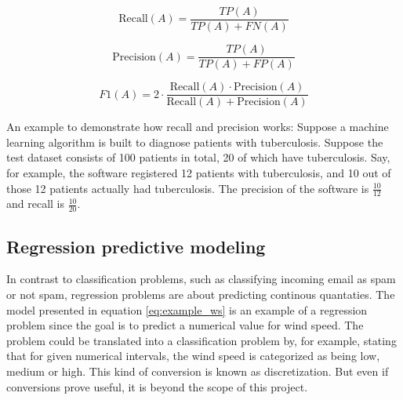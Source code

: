 \begin{equation} \label{eq:recall}
	\mbox{Recall}(A) = \frac{TP(A)}{TP(A) + FN(A)}
\end{equation}

\begin{equation} \label{eq:precision}
	\mbox{Precision}(A) = \frac{TP(A)}{TP(A) + FP(A)}
\end{equation}

\begin{equation} \label{eq:f1}
	F1(A) = 2 \cdot \frac{\mbox{Recall}(A) \cdot \mbox{Precision}(A)}{\mbox{Recall}(A) + \mbox{Precision}(A)}
\end{equation}

	An example to demonstrate how recall and precision works: Suppose a machine learning algorithm is built to diagnose patients with tuberculosis. Suppose the test dataset consists of 100 patients in total, 20 of which have tuberculosis. Say, for example,  the software registered 12 patients with tuberculosis, and 10 out of those 12 patients actually had tuberculosis. The precision of the software is $\frac{10}{12}$ and recall is $\frac{10}{20}$.


	\subsection{Regression predictive modeling} \label{sec:regression}
	In contrast to classification problems, such as classifying incoming email as spam or not spam, regression problems are about predicting continous quantaties. The model presented in equation \ref{eq:example_ws} is an example of a regression problem since the goal is to predict a numerical value for wind speed. The problem could be translated into a classification problem by, for example, stating that for given numerical intervals, the wind speed is categorized as being low, medium or high. This kind of conversion is known as discretization. But even if conversions prove useful, it is beyond the scope of this project. 

